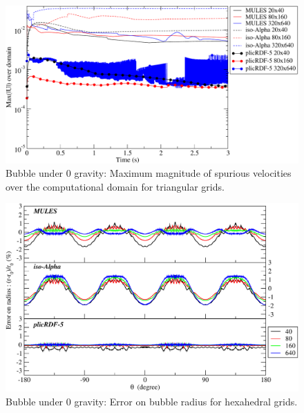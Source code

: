 \documentclass[review]{elsarticle}
\begin{document}
\begin{figure}[!h]
  \includegraphics[width=\textwidth]{figures/spuriousCurrents_MaxmagU_compareOF_20_80_320_uns.pdf}
  \caption{Bubble under 0 gravity: Maximum magnitude of spurious velocities over the computational domain for triangular grids.}
  \label{fig:spuriousCurrents_MaxmagU_uns}
\end{figure}

\begin{figure}[!h]
  \includegraphics[width=\textwidth]{figures/spuriousCurrents_bubble_error_radius_struct.pdf}
  \caption{Bubble under 0 gravity: Error on bubble radius for hexahedral grids.}
  \label{fig:spuriousCurrents_bubble_error_radius_struct}
\end{figure}
\end{document}
